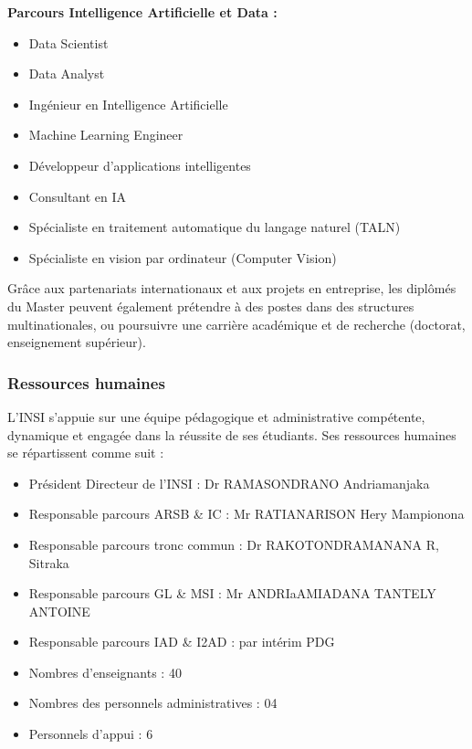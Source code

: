 \documentclass[a4paper,12pt, oneside]{article}
\begin{document}
\textbf{Parcours Intelligence Artificielle et Data :}
\begin{itemize}
    \item Data Scientist
    \item Data Analyst
    \item Ingénieur en Intelligence Artificielle
    \item Machine Learning Engineer
    \item Développeur d'applications intelligentes
    \item Consultant en IA
    \item Spécialiste en traitement automatique du langage naturel (TALN)
    \item Spécialiste en vision par ordinateur (Computer Vision)
\end{itemize}

Grâce aux partenariats internationaux et aux projets en entreprise, les diplômés du Master peuvent également prétendre à des postes dans des structures multinationales, ou poursuivre une carrière académique et de recherche (doctorat, enseignement supérieur).\\

\subsubsection{Ressources humaines} 
L’INSI s’appuie sur une équipe pédagogique et administrative compétente, dynamique et engagée dans la réussite de ses étudiants. Ses ressources humaines se répartissent comme suit :
\begin{itemize}
    \item Président Directeur de l’INSI : Dr RAMASONDRANO Andriamanjaka
    \item Responsable parcours ARSB \& IC : Mr RATIANARISON Hery Mampionona
    \item Responsable parcours tronc commun : Dr RAKOTONDRAMANANA R, Sitraka
    \item Responsable parcours GL \& MSI : Mr ANDRIaAMIADANA TANTELY ANTOINE
    \item Responsable parcours IAD \& I2AD : par intérim PDG
    \item Nombres d'enseignants : 40
    \item Nombres des personnels administratives : 04
    \item Personnels d’appui : 6
\end{itemize}

\vfill*{}
\newpage
\end{document}
